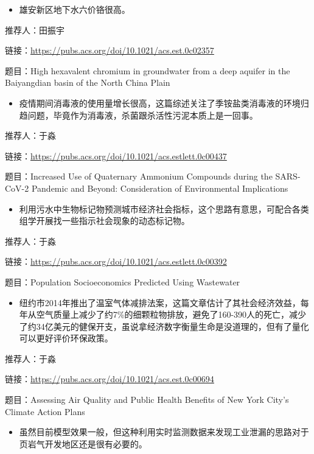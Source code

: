\documentclass[]{book}
\providecommand{\tightlist}{%
  \setlength{\itemsep}{0pt}\setlength{\parskip}{0pt}}
\begin{document}
\begin{itemize}
\tightlist
\item
  雄安新区地下水六价铬很高。
\end{itemize}

推荐人：田振宇

链接：\url{https://pubs.acs.org/doi/10.1021/acs.est.0c02357}

题目：High hexavalent chromium in groundwater from a deep aquifer in the Baiyangdian basin of the North China Plain

\begin{itemize}
\tightlist
\item
  疫情期间消毒液的使用量增长很高，这篇综述关注了季铵盐类消毒液的环境归趋问题，毕竟作为消毒液，杀菌跟杀活性污泥本质上是一回事。
\end{itemize}

推荐人：于淼

链接：\url{https://pubs.acs.org/doi/10.1021/acs.estlett.0c00437}

题目：Increased Use of Quaternary Ammonium Compounds during the SARS-CoV-2 Pandemic and Beyond: Consideration of Environmental Implications

\begin{itemize}
\tightlist
\item
  利用污水中生物标记物预测城市经济社会指标，这个思路有意思，可配合各类组学开展找一些指示社会现象的动态标记物。
\end{itemize}

推荐人：于淼

链接：\url{https://pubs.acs.org/doi/10.1021/acs.estlett.0c00392}

题目：Population Socioeconomics Predicted Using Wastewater

\begin{itemize}
\tightlist
\item
  纽约市2014年推出了温室气体减排法案，这篇文章估计了其社会经济效益，每年从空气质量上减少了约7\%的细颗粒物排放，避免了160-390人的死亡，减少了约34亿美元的健保开支，虽说拿经济数字衡量生命是没道理的，但有了量化可以更好评价环保政策。
\end{itemize}

推荐人：于淼

链接：\url{https://pubs.acs.org/doi/10.1021/acs.est.0c00694}

题目：Assessing Air Quality and Public Health Benefits of New York City's Climate Action Plans

\begin{itemize}
\tightlist
\item
  虽然目前模型效果一般，但这种利用实时监测数据来发现工业泄漏的思路对于页岩气开发地区还是很有必要的。
\end{itemize}
\end{document}
